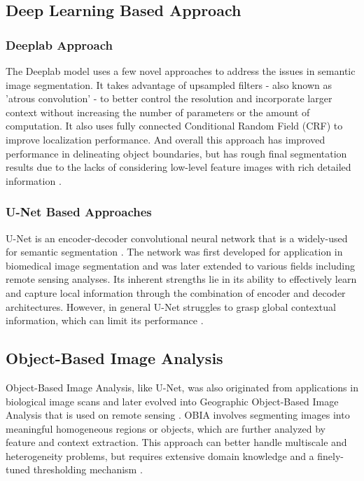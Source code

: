 \documentclass[10pt,twocolumn,letterpaper]{article}
\begin{document}
\subsection{Deep Learning Based Approach}

\subsubsection{Deeplab Approach}

The Deeplab model \cite{deeplab7913730} uses a few novel approaches to address the issues in semantic image segmentation. It takes advantage of upsampled filters - also known as 'atrous convolution' - to better control the resolution and incorporate larger context without increasing the number of parameters or the amount of computation. It also uses fully connected Conditional Random Field (CRF) to improve localization performance. And overall this approach has improved performance in delineating object boundaries, but has rough final segmentation results due to the lacks of considering low-level feature images with rich detailed information \cite{wang2022improved}. 

\subsubsection{U-Net Based Approaches} 

 U-Net is an encoder-decoder convolutional neural network that is a widely-used for semantic segmentation \cite{ronneberger2015unet}. The network was first developed for application in biomedical image segmentation and was later extended to various fields including remote sensing analyses. Its inherent strengths lie in its ability to effectively learn and capture local information through the combination of encoder and decoder architectures. However, in general U-Net struggles to grasp global contextual information, which can limit its performance \cite{shahedi2020study}.

\subsection{Object-Based Image Analysis}

Object-Based Image Analysis, like U-Net, was also originated from applications in biological image scans and later evolved into Geographic Object-Based Image Analysis that is used on remote sensing \cite{blaschke2010object}. OBIA involves segmenting images into meaningful homogeneous regions or objects, which are further analyzed by feature and context extraction. This approach can better handle multiscale and heterogeneity problems, but requires extensive domain knowledge and a finely-tuned thresholding mechanism \cite{Hay2006ObjectbasedIA}.
\end{document}
